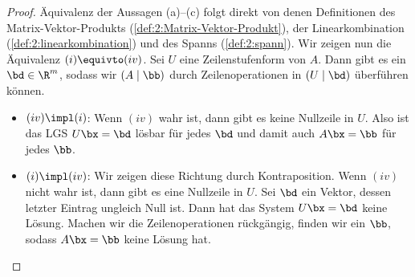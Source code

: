 \begin{proof}
	Äquivalenz der Aussagen (a)--(c) folgt direkt von denen Definitionen des Matrix-Vektor-Produkts (\cref{def:2:Matrix-Vektor-Produkt}), der Linearkombination (\cref{def:2:linearkombination}) und des Spanns (\cref{def:2:spann}). Wir zeigen nun die Äquivalenz $(i) \equivto (iv)$. Sei $U$ eine Zeilenstufenform von $A$. Dann gibt es ein $\bd \in \R^m$, sodass wir $(A \mid \bb)$ durch Zeilenoperationen in $(U \mid \bd)$ überführen können.

	\begin{itemize}
		\item $(iv) \impl (i)$: Wenn $(iv)$ wahr ist, dann gibt es keine Nullzeile in $U$. Also ist das LGS $U\bx = \bd$ lösbar für jedes $\bd$ und damit auch $A\bx = \bb$ für jedes $\bb$.
		\item $(i) \impl (iv)$: Wir zeigen diese Richtung durch Kontraposition. Wenn $(iv)$ nicht wahr ist, dann gibt es eine Nullzeile in $U$. Sei $\bd$ ein Vektor, dessen letzter Eintrag ungleich Null ist. Dann hat das System $U\bx = \bd$ keine Lösung. Machen wir die Zeilenoperationen rückgängig, finden wir ein $\bb$, sodass $A \bx = \bb$ keine Lösung hat. \qedhere
	\end{itemize}
\end{proof}
